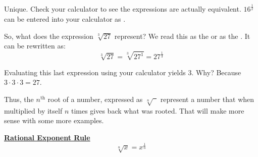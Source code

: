 Unique.  Check your calculator to see the expressions are actually equivalent. $16^{\frac{1}{2}}$ can be entered into your calculator as .

So, what does the expression $\sqrt[3]{27}$ represent? We read this as the  or as the . It can be rewritten as:
$$\sqrt[3]{27} = \sqrt[3]{27^1} = 27^{\frac{1}{3}}$$

Evaluating this last expression using your calculator yields $3$. Why? Because $3 \cdot 3 \cdot 3 = 27$.

Thus, the $n^{\text{th}}$ root of a number, expressed as $\sqrt[n]{\phantom{a}}$ represent a number that when multiplied by itself $n$ times gives back what was rooted.  That will make more sense with some more examples.

%
%
\begin{definition}
	\textbf{\underline{Rational Exponent Rule}}\\
	$$\sqrt[n]{x}=x^{\frac{1}{n}}$$
\end{definition}







%
%

